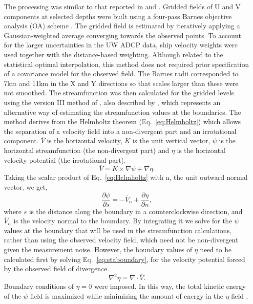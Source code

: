 The processing was similar to that reported in \citet{barth00} and
\citet{Pierce00}. Gridded fields of U and V components at selected
depths were built using a four-pass Barnes objective analysis (OA)
scheme \citep{barnes94,koch83}.  The gridded field is estimated by
iteratively applying a Gaussian-weighted average converging
towards the observed points. To account for the larger
uncertainties in the UW ADCP data, ship velocity weights were used
together with the distance-based weighting.  Although related to
the statistical optimal interpolation, this method does not
required prior specification of a covariance model for the
observed field.  The Barnes radii corresponded to 7km and 11km in
the X and Y directions so that scales larger than these were not
smoothed. The streamfunction was then calculated for the gridded
levels using the version III method of \citet{hawkins65}, also
described by \citet{carter87}, which represents an alternative way
of estimating the streamfunction values at the boundaries. The
method derives from the Helmholtz theorem (Eq.~\ref{eq:Helmholtz})
which allows the separation of a velocity field into a
non-divergent part and an irrotational component. $\overline{V}$
is the horizontal velocity, $K$ is the unit vertical vector,
$\psi$ is the horizontal streamfunction (the non-divergent part)
and $\eta$ is the horizontal velocity potential (the irrotational
part).
\begin{equation}\label{eq:Helmholtz}
  \overline{V}=K\times\nabla\psi+\nabla\eta.
\end{equation}
Taking the scalar product of Eq.~\ref{eq:Helmholtz} with n, the
unit outward normal vector, we get,
\begin{equation}\label{eq:streamboundary}
  \frac{\partial\psi}{\partial
  s}=-\overline{V}_{n}+\frac{\partial\eta}{\partial n},
\end{equation}
where $s$ is the distance along the boundary in a counterclockwise
direction, and $\overline{V}_{n}$ is the velocity normal to the
boundary. By integrating it we solve for the $\psi$ values at the
boundary that will be used in the streamfunction calculations,
rather than using the observed velocity field, which need not be
non-divergent given the measurement noise. However, the boundary
values of $\eta$ need to be calculated first by solving
Eq.~\ref{eq:etaboundary}, for the velocity potential forced by the
observed field of divergence.
\begin{equation}\label{eq:etaboundary}
  \nabla^{2}\eta=\nabla\cdot\overline{V}.
\end{equation}
Boundary conditions of $\eta=0$ were imposed. In this way, the
total kinetic energy of the $\psi$ field is maximized while
minimizing the amount of energy in the $\eta$ field
\citep{carter87}.

